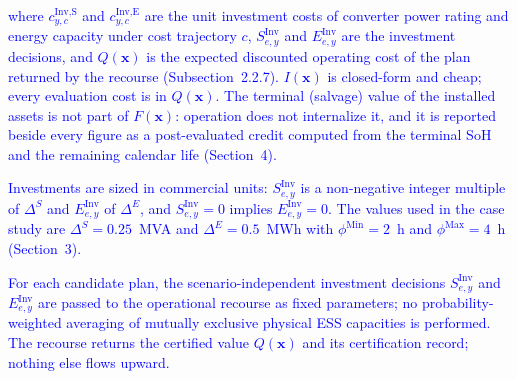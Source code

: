 \noindent
\textcolor{blue}{where $c^{\text{Inv,S}}_{y,c}$ and $c^{\text{Inv,E}}_{y,c}$ are the unit investment costs of
converter power rating and energy capacity under cost trajectory $c$, $S^{\text{Inv}}_{e,y}$ and
$E^{\text{Inv}}_{e,y}$ are the investment decisions, and $Q(\boldsymbol{x})$ is the expected discounted operating
cost of the plan returned by the recourse (Subsection~2.2.7). $I(\boldsymbol{x})$ is closed-form and cheap; every
evaluation cost is in $Q(\boldsymbol{x})$. The terminal (salvage) value of the installed assets is not part of
$F(\boldsymbol{x})$: operation does not internalize it, and it is reported beside every figure as a post-evaluated
credit computed from the terminal SoH and the remaining calendar life (Section~4).}



\textcolor{blue}{Investments are sized in commercial units: $S^{\text{Inv}}_{e,y}$ is a non-negative integer
multiple of $\Delta^S$ and $E^{\text{Inv}}_{e,y}$ of $\Delta^E$, and $S^{\text{Inv}}_{e,y} = 0$ implies
$E^{\text{Inv}}_{e,y} = 0$. The values used in the case study are $\Delta^S = 0.25$~MVA and
$\Delta^E = 0.5$~MWh with $\phi^{\text{Min}} = 2$~h and $\phi^{\text{Max}} = 4$~h (Section~3).}


\textcolor{blue}{For each candidate plan, the scenario-independent investment decisions $S^{\text{Inv}}_{e,y}$
and $E^{\text{Inv}}_{e,y}$ are passed to the operational recourse as fixed parameters; no probability-weighted
averaging of mutually exclusive physical ESS capacities is performed. The recourse returns the certified
value $Q(\boldsymbol{x})$ and its certification record; nothing else flows upward.}


